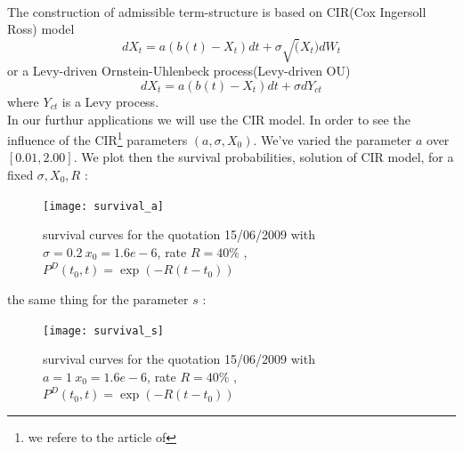 \paragraph{}
The  construction of  admissible term-structure  is based  on CIR(Cox  Ingersoll
Ross) model 
\[
dX_t=a(b(t) - X_t)dt + \sigma \sqrt(X_t)dW_t
\]
or a Levy-driven Ornstein-Uhlenbeck process(Levy-driven OU)
\[
dX_t= a(b(t) - X_t)dt + \sigma dY_{ct}
\]
where $Y_{ct}$ is a Levy process. \\
In our furthur applications we will use the CIR model. In order to see the influence of the CIR\footnote{ we refere to the article of
}   parameters   $(a,\sigma,X_0)$.  We've   varied   the   parameter  $a$   over
$[0.01,2.00]$. We plot  then the survival probabilities, solution  of CIR model,
for a fixed $\sigma,X_0,R$ :
\begin{figure}[H]
  \centering 
    \texttt{[image: survival\_a]}
  \caption{survival curves for the quotation 15/06/2009 with $\sigma = 0.2 \ x_0
    = 1.6e-6$, rate $R = 40 \%$ , $P^D(t_0,t)=\exp(-R(t-t_0))$}
  \label{fig:11}
\end{figure}

the same thing for the parameter $s$ :

\begin{figure}[H]
  \centering 
    \texttt{[image: survival\_s]}
  \caption{survival curves for the quotation 15/06/2009 with $a = 1 \ x_0
    = 1.6e-6$, rate $R = 40 \%$ , $P^D(t_0,t)=\exp(-R(t-t_0))$}
  \label{fig:11}
\end{figure}
